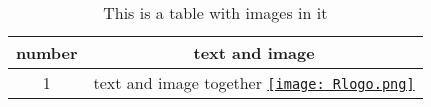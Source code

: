 \documentclass{article}
\begin{document}
\begin{table}

\caption{\label{tab:unnamed-chunk-2}This is a table with images in it}
\centering
\begin{tabular}[t]{c|c}
\hline
number & text and image\\
\hline
1 & text and image together 
\href{https://www.r-project.org/logo/Rlogo.png}{\texttt{[image: Rlogo.png]}}


\\
\hline
\end{tabular}
\end{table}
\end{document}
